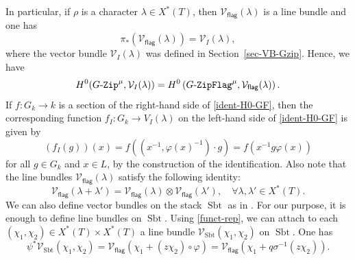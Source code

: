 \documentclass[11pt]{amsart}
\numberwithin{equation}{section}
\theoremstyle{definition}
\theoremstyle{remark}
\newcommand{\GZip}{\mathop{\text{$G$-{\tt Zip}}}\nolimits}
\newcommand{\flag}{\mathsf{flag}}
\newcommand{\GF}{\mathop{\text{$G$-{\tt ZipFlag}}}\nolimits}
\newcommand{\Vcal}{{\mathcal V}}
\DeclareMathOperator{\Sbt}{Sbt}
\begin{document}
In particular, if $\rho$ is a character $\lambda\in X^*(T)$, then $\Vcal_{\flag}(\lambda)$ is a line bundle and one has 
\begin{equation}\label{pushforward-lambda}
    \pi_*\left(\Vcal_{\flag}(\lambda)\right)=\Vcal_I(\lambda), 
\end{equation}
where the vector bundle $\Vcal_I(\lambda)$ was defined in Section~\ref{sec-VB-Gzip}. Hence, we have 
\begin{equation}\label{ident-H0-GF}
    H^0(\GZip^\mu,\Vcal_I(\lambda))=H^0\left(\GF^\mu,\Vcal_{\flag}(\lambda)\right).
\end{equation}
If $f \colon G_k \to k$ is a section of the right-hand side of \eqref{ident-H0-GF}, 
then the corresponding function 
$f_I \colon G_k \to V_I (\lambda)$ 
on the left-hand side of 
\eqref{ident-H0-GF} is given by 
\begin{equation}\label{eq:H0expid}
 (f_I (g))(x)=f \left(\left(x^{-1},\varphi(x)^{-1}\right) \cdot g\right)= 
 f\left(x^{-1} g \varphi (x)\right) 
\end{equation}
for all $g \in G_k$ and $x \in L$, by the construction of the identification. 
Also note  that the line bundles $\Vcal_{\flag}(\lambda)$ satisfy the following identity:
\begin{equation}\label{Vflag-additivity}
\Vcal_{\flag}(\lambda+\lambda')=\Vcal_{\flag}(\lambda)\otimes \Vcal_{\flag}(\lambda'), \quad \forall \lambda, \lambda'\in X^*(T).
\end{equation}
We can also define vector bundles on the stack $\Sbt$ as in \cite[Section~4]{Imai-Koskivirta-partial-Hasse}. For our purpose, it is enough to define line bundles on $\Sbt$. Using \eqref{funct-rep}, we can attach to each $(\chi_1,\chi_2)\in X^*(T)\times X^*(T)$ a line bundle $\Vcal_{\Sbt}(\chi_1,\chi_2)$ on $\Sbt$. One has
\begin{equation}\label{pullbackformula}
\psi^*\Vcal_{\Sbt}(\chi_1,\chi_2)=\Vcal_{\flag}(\chi_1+(z\chi_2)\circ \varphi)=\Vcal_{\flag}\left(\chi_1+q\sigma^{-1}(z\chi_2)\right).
\end{equation}
\end{document}
